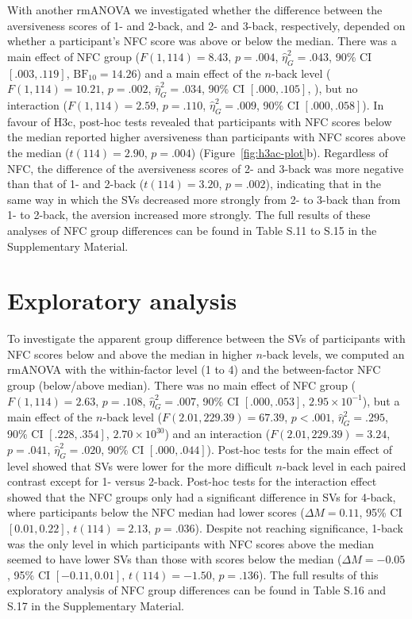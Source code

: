 \documentclass[
  man,floatsintext]{apa6}
\begin{document}
With another rmANOVA we investigated whether the difference between the aversiveness scores of 1- and 2-back, and 2- and 3-back, respectively, depended on whether a participant's NFC score was above or below the median.
There was a main effect of NFC group (\(F(1, 114) = 8.43\), \(p = .004\), \(\hat{\eta}^2_G = .043\), 90\% CI \([.003, .119]\), \(\mathrm{BF}_{\textrm{10}} = 14.26\)) and a main effect of the \(n\)-back level (\(F(1, 114) = 10.21\), \(p = .002\), \(\hat{\eta}^2_G = .034\), 90\% CI \([.000, .105]\), ), but no interaction (\(F(1, 114) = 2.59\), \(p = .110\), \(\hat{\eta}^2_G = .009\), 90\% CI \([.000, .058]\)).
In favour of H3c, post-hoc tests revealed that participants with NFC scores below the median reported higher aversiveness than participants with NFC scores above the median (\(t(114) = 2.90\), \(p = .004\)) (Figure~\ref{fig:h3ac-plot}b).
Regardless of NFC, the difference of the aversiveness scores of 2- and 3-back was more negative than that of 1- and 2-back (\(t(114) = 3.20\), \(p = .002\)), indicating that in the same way in which the SVs decreased more strongly from 2- to 3-back than from 1- to 2-back, the aversion increased more strongly.
The full results of these analyses of NFC group differences can be found in Table S.11 to S.15 in the Supplementary Material.

\hypertarget{exploratory-analysis}{%
\section{Exploratory analysis}\label{exploratory-analysis}}

To investigate the apparent group difference between the SVs of participants with NFC scores below and above the median in higher \(n\)-back levels, we computed an rmANOVA with the within-factor level (1 to 4) and the between-factor NFC group (below/above median).
There was no main effect of NFC group (\(F(1, 114) = 2.63\), \(p = .108\), \(\hat{\eta}^2_G = .007\), 90\% CI \([.000, .053]\), \(2.95 \times 10^{-1}\)), but a main effect of the \(n\)-back level (\(F(2.01, 229.39) = 67.39\), \(p < .001\), \(\hat{\eta}^2_G = .295\), 90\% CI \([.228, .354]\), \(2.70 \times 10^{30}\)) and an interaction (\(F(2.01, 229.39) = 3.24\), \(p = .041\), \(\hat{\eta}^2_G = .020\), 90\% CI \([.000, .044]\)).
Post-hoc tests for the main effect of level showed that SVs were lower for the more difficult \(n\)-back level in each paired contrast except for 1- versus 2-back.
Post-hoc tests for the interaction effect showed that the NFC groups only had a significant difference in SVs for 4-back, where participants below the NFC median had lower scores (\(\Delta M = 0.11\), 95\% CI \([0.01, 0.22]\), \(t(114) = 2.13\), \(p = .036\)).
Despite not reaching significance, 1-back was the only level in which participants with NFC scores above the median seemed to have lower SVs than those with scores below the median (\(\Delta M = -0.05\), 95\% CI \([-0.11, 0.01]\), \(t(114) = -1.50\), \(p = .136\)).
The full results of this exploratory analysis of NFC group differences can be found in Table S.16 and S.17 in the Supplementary Material.
\end{document}

